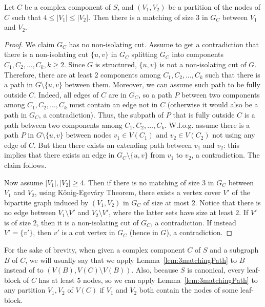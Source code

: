 \documentclass{theoretics}
\begin{document}
\begin{lemma}\label{lem:3matchingPath}
    Let $C$ be a complex component of $S$, and $(V_1, V_2)$ be a partition of the nodes of $C$ such that $4\leq |V_1|\leq |V_2|$. Then there is a matching of size $3$ in $G_C$ between $V_1$ and $V_2$.
\end{lemma}
\begin{proof}
    We claim $G_C$ has no non-isolating cut. Assume to get a contradiction that there is a non-isolating cut $\{u, v\}$ in $G_C$ splitting $G_C$ into components $C_1, C_2, \dots, C_k, k\geq 2$. Since $G$ is structured, $\{u, v\}$ is not a non-isolating cut of $G$. Therefore, there are at least $2$ components among $C_1, C_2, \dots, C_k$ such that there is a path in $G\setminus\{u, v\}$ between them. Moreover, we can assume such path to be fully outside $C$. Indeed, all edges of $C$ are in $G_C$, so a path $P$ between two components among $C_1, C_2, \dots, C_k$ must contain an edge not in $C$ (otherwise it would also be a path in $G_C$, a contradiction). Thus, the subpath of $P$ that is fully outside $C$ is a path between two components among $C_1, C_2, \dots, C_k$. W.l.o.g. assume there is a path $P$ in $G\setminus\{u, v\}$ between nodes $v_1\in V(C_1)$ and $v_2\in V(C_2)$ not using any edge of $C$. But then there exists an extending path between $v_1$ and $v_2$: this implies that there exists an edge in $G_C\setminus\{u, v\}$ from $v_1$ to $v_2$, a contradiction. The claim follows.
    
    Now assume $|V_1|,|V_2|\ge 4$. Then if there is no matching of size $3$ in $G_C$ between $V_1$ and $V_2$, using König-Egeváry Theorem, there exists a vertex cover $V'$ of the bipartite graph induced by $(V_1,V_2)$ in $G_C$ of size at most $2$. Notice that there is no edge between $V_1\setminus V'$ and $V_2\setminus V'$, where the latter sets have size at least $2$. If $V'$ is of size $2$, then it is a non-isolating cut of $G_C$, a contradiction. If instead $V'=\{v'\}$, then $v'$ is a cut vertex in $G_C$ (hence in $G$), a contradiction.
\end{proof}

For the sake of brevity, when given a complex component $C$ of $S$ and a subgraph $B$ of $C$, we will usually say that we apply Lemma~\ref{lem:3matchingPath} to $B$ instead of to $(V(B), V(C)\setminus V(B))$. Also, because $S$ is canonical, every leaf-block of $C$ has at least $5$ nodes, so we can apply Lemma~\ref{lem:3matchingPath} to any partition $V_1, V_2$ of $V(C)$ if $V_1$ and $V_2$ both contain the nodes of some leaf-block. 
\end{document}
